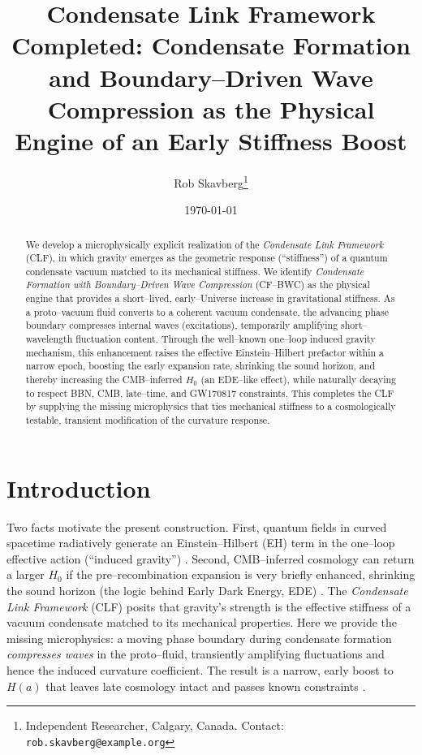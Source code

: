 \documentclass[11pt,a4paper]{article}
\title{\textbf{Condensate Link Framework Completed: Condensate Formation and Boundary--Driven Wave Compression as the Physical Engine of an Early Stiffness Boost}}
\author{Rob Skavberg\thanks{Independent Researcher, Calgary, Canada. Contact: \texttt{rob.skavberg@example.org}}}
\date{\today}
\begin{document}
\maketitle
\doublespacing

\begin{abstract}
We develop a microphysically explicit realization of the \emph{Condensate Link Framework} (CLF), in which gravity emerges as the geometric response (``stiffness'') of a quantum condensate vacuum matched to its mechanical stiffness. We identify \emph{Condensate Formation with Boundary--Driven Wave Compression} (CF--BWC) as the physical engine that provides a short--lived, early--Universe increase in gravitational stiffness. As a proto--vacuum fluid converts to a coherent vacuum condensate, the advancing phase boundary compresses internal waves (excitations), temporarily amplifying short--wavelength fluctuation content. Through the well--known one--loop induced gravity mechanism, this enhancement raises the effective Einstein--Hilbert prefactor within a narrow epoch, boosting the early expansion rate, shrinking the sound horizon, and thereby increasing the CMB--inferred $H_0$ (an EDE--like effect), while naturally decaying to respect BBN, CMB, late--time, and GW170817 constraints. This completes the CLF by supplying the missing microphysics that ties mechanical stiffness to a cosmologically testable, transient modification of the curvature response.
\end{abstract}

\section{Introduction}
Two facts motivate the present construction. First, quantum fields in curved spacetime radiatively generate an Einstein--Hilbert (EH) term in the one--loop effective action (``induced gravity'') \cite{Sakharov1967,Vassilevich2003,Schwinger1951}. Second, CMB--inferred cosmology can return a larger $H_0$ if the pre--recombination expansion is very briefly enhanced, shrinking the sound horizon (the logic behind Early Dark Energy, EDE) \cite{EDEReview2023,PoulinReview2023,Planck2018}. The \emph{Condensate Link Framework} (CLF) posits that gravity's strength is the effective stiffness of a vacuum condensate matched to its mechanical properties. Here we provide the missing microphysics: a moving phase boundary during condensate formation \emph{compresses waves} in the proto--fluid, transiently amplifying fluctuations and hence the induced curvature coefficient. The result is a narrow, early boost to $H(a)$ that leaves late cosmology intact and passes known constraints \cite{RiessReview2024,GW170817,Alvey2020}.
\end{document}
